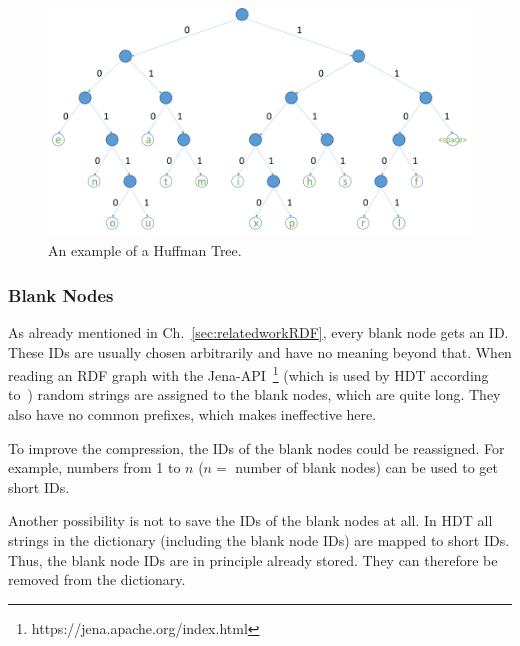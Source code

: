 \begin{figure}
	\centering
	\includegraphics[width=0.9\linewidth]{figures/4_rdf_specific_features/huffman}
	\caption{An example of a Huffman Tree.}
	\label{fig:huffmantree}
\end{figure}

\subsubsection{Blank Nodes}\label{sec:approachBlankNodes}

As already mentioned in Ch.~\ref{sec:relatedworkRDF}, every blank node gets an ID. These IDs are usually chosen arbitrarily and have no meaning beyond that. When reading an RDF graph with the Jena-API~\footnote{\label{foot:5}https://jena.apache.org/index.html} (which is used by HDT according to~\cite{hdt}) random strings are assigned to the blank nodes, which are quite long. They also have no common prefixes, which makes \DHDT{} ineffective here. 

To improve the compression, the IDs of the blank nodes could be reassigned. For example, numbers from 1 to $n$ ($n=$ number of blank nodes) can be used to get short IDs. 

Another possibility is not to save the IDs of the blank nodes at all. In HDT all strings in the dictionary (including the blank node IDs) are mapped to short IDs. Thus, the blank node IDs are in principle already stored. They can therefore be removed from the dictionary. 















